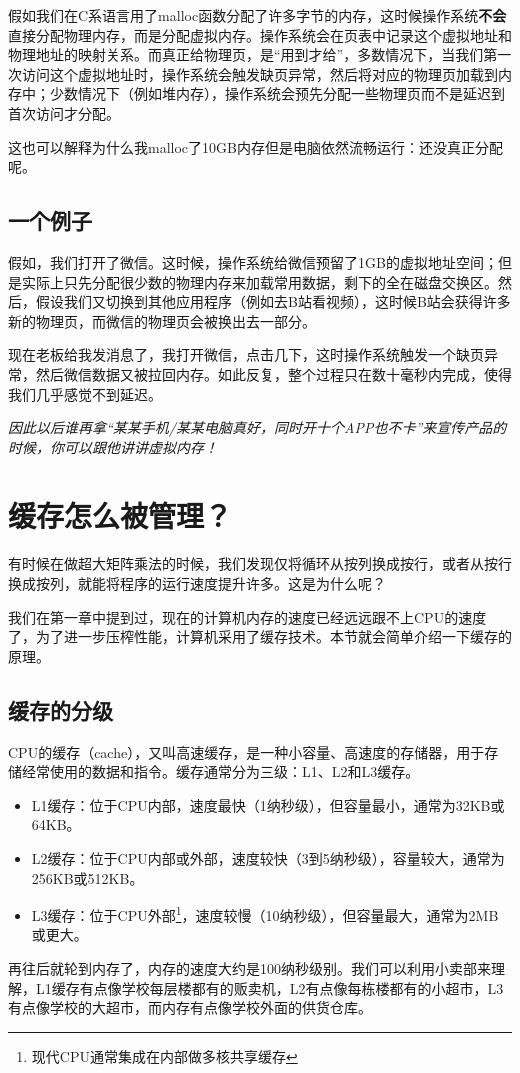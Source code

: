 \documentclass[../main.tex]{subfiles}
\begin{document}
假如我们在C系语言用了malloc函数分配了许多字节的内存，这时候操作系统\textbf{不会}直接分配物理内存，而是分配虚拟内存。操作系统会在页表中记录这个虚拟地址和物理地址的映射关系。而真正给物理页，是“用到才给”，多数情况下，当我们第一次访问这个虚拟地址时，操作系统会触发缺页异常，然后将对应的物理页加载到内存中；少数情况下（例如堆内存），操作系统会预先分配一些物理页而不是延迟到首次访问才分配。

这也可以解释为什么我malloc了10GB内存但是电脑依然流畅运行：还没真正分配呢。

\subsection{一个例子}

假如，我们打开了微信。这时候，操作系统给微信预留了1GB的虚拟地址空间；但是实际上只先分配很少数的物理内存来加载常用数据，剩下的全在磁盘交换区。然后，假设我们又切换到其他应用程序（例如去B站看视频），这时候B站会获得许多新的物理页，而微信的物理页会被换出去一部分。

现在老板给我发消息了，我打开微信，点击几下，这时操作系统触发一个缺页异常，然后微信数据又被拉回内存。如此反复，整个过程只在数十毫秒内完成，使得我们几乎感觉不到延迟。

\emph{因此以后谁再拿“某某手机/某某电脑真好，同时开十个APP也不卡”来宣传产品的时候，你可以跟他讲讲虚拟内存！}

\section{缓存怎么被管理？}

有时候在做超大矩阵乘法的时候，我们发现仅将循环从按列换成按行，或者从按行换成按列，就能将程序的运行速度提升许多。这是为什么呢？

我们在第一章中提到过，现在的计算机内存的速度已经远远跟不上CPU的速度了，为了进一步压榨性能，计算机采用了缓存技术。本节就会简单介绍一下缓存的原理。

\subsection{缓存的分级}

CPU的缓存（cache），又叫高速缓存，是一种小容量、高速度的存储器，用于存储经常使用的数据和指令。缓存通常分为三级：L1、L2和L3缓存。
\begin{itemize}
  \item L1缓存：位于CPU内部，速度最快（1纳秒级），但容量最小，通常为32KB或64KB。
  \item L2缓存：位于CPU内部或外部，速度较快（3到5纳秒级），容量较大，通常为256KB或512KB。
  \item L3缓存：位于CPU外部\footnote{现代CPU通常集成在内部做多核共享缓存}，速度较慢（10纳秒级），但容量最大，通常为2MB或更大。
\end{itemize}
再往后就轮到内存了，内存的速度大约是100纳秒级别。我们可以利用小卖部来理解，L1缓存有点像学校每层楼都有的贩卖机，L2有点像每栋楼都有的小超市，L3有点像学校的大超市，而内存有点像学校外面的供货仓库。
\end{document}
